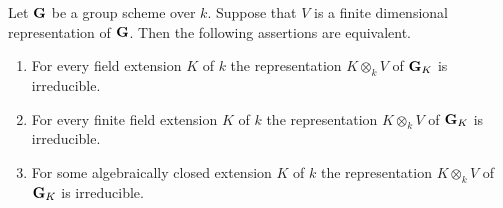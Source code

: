 \begin{theorem}\label{theorem:absolutely_irreducible}
Let $\mathbf{G}$ be a group scheme over $k$. Suppose that $V$ is a finite dimensional representation of $\mathbf{G}$. Then the following assertions are equivalent.
\begin{enumerate}[label=\emph{\textbf{(\roman*)}}, leftmargin=3.0em]
\item For every field extension $K$ of $k$ the representation $K\otimes_kV$ of $\mathbf{G}_K$ is irreducible.
\item For every finite field extension $K$ of $k$ the representation $K\otimes_kV$ of $\mathbf{G}_K$ is irreducible.
\item For some algebraically closed extension $K$ of $k$ the representation $K\otimes_kV$ of $\mathbf{G}_K$ is irreducible.
\end{enumerate}
\end{theorem}
